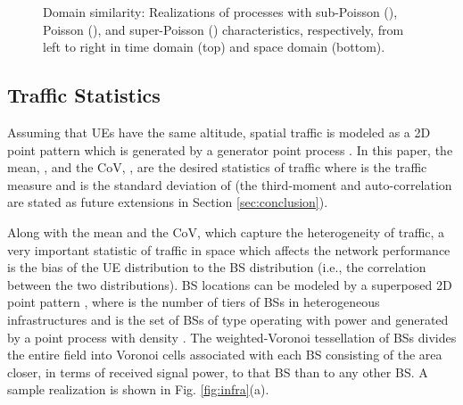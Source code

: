 \documentclass[journal]{IEEEtran}
\begin{document}
\begin{figure}
   \centering
   \vfill
   \hfill
   \hfill
   \hfill
   \caption{Domain similarity: Realizations of processes with sub-Poisson (), Poisson (), and super-Poisson () characteristics, respectively, from left to right in time domain (top) and space domain (bottom).}
   \label{fig:domainsimilarity}
\end{figure}



























\subsection{Traffic Statistics}
\label{subsec:statistics}

Assuming that UEs have the same altitude, spatial traffic is modeled as a 2D point pattern  which is generated by a generator point process . In this paper, the mean, , and the CoV, , are the desired statistics of traffic where  is the traffic measure and  is the standard deviation of  (the third-moment and auto-correlation are stated as future extensions in Section \ref{sec:conclusion}).

Along with the mean and the CoV, which capture the heterogeneity of traffic, a very important statistic of traffic in space which affects the network performance is the bias of the UE distribution to the BS distribution (i.e., the correlation between the two distributions). BS locations can be modeled by a superposed 2D point pattern , where  is the number of tiers of BSs in heterogeneous infrastructures and  is the set of BSs of type  operating with power  and generated by a point process  with density . The weighted-Voronoi tessellation of BSs divides the entire field into Voronoi cells associated with each BS consisting of the area closer, in terms of received signal power, to that BS than to any other BS. A sample realization is shown in Fig. \ref{fig:infra}(a).
\end{document}
